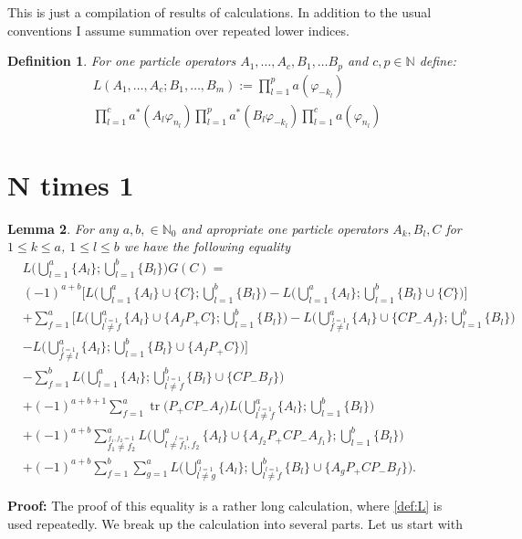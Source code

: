 \documentclass[b5paper,draft,openbib,12pt]{memoir}
\newtheorem{Def}{Definition}[section]
\newtheorem{Lemma}[Def]{Lemma}
\DeclareMathOperator{\tr}{tr}
\begin{document}
\frontmatter
%
\mainmatter

This is just a compilation of results of calculations. In addition to the usual conventions I assume summation over
repeated lower indices. 

\begin{Def}
For one particle operators \(A_1,\dots, A_c,B_1,\dots B_p \) and \(c,p\in\mathbb{N}\) define:
\begin{multline}\label{def:L}
L(A_1,\dots, A_c; B_1,\dots ,B_m):= \prod_{l=1}^p a(\varphi_{-k_l}) \\
\prod_{l=1}^c a^*(A_l \varphi_{n_l}) \prod_{l=1}^p a^*(B_l \varphi_{-k_l}) \prod_{l=1}^c a(\varphi_{n_l})
\end{multline}
\end{Def}


\section{N times 1}

\begin{Lemma} For any \(a,b,\in\mathbb{N}_0\) and apropriate one particle operators \(A_k, B_l, C\) for \(1\le k\le a\), \(1\le l\le b\) we have the following equality
\begin{align*}
&L\Big(\bigcup_{l=1}^a \{A_l\}; \bigcup_{l=1}^b \{B_l\}\Big)G(C) =\\
 &(-1)^{a+b}\Big[ L\Big(\bigcup_{l=1}^a \{A_l\}\cup \{C\}; \bigcup_{l=1}^b \{B_l\}\Big) - L\Big(\bigcup_{l=1}^a \{A_l\}; \bigcup_{l=1}^b \{B_l\}\cup \{C\} \Big) \Big]\\
&+ \sum_{f=1}^a \Big[ L\Big(\bigcup_{\stackrel{l=1}{l\neq f}}^a \{A_l\}\cup \{A_fP_+C \}; \bigcup_{l=1}^b \{B_l\}\Big) - 
 L\Big(\bigcup_{\stackrel{l=1}{f\neq l}}^a \{A_l\}\cup \{CP_- A_f\}; \bigcup_{l=1}^b \{B_l\}\Big)\\
& -L\Big(\bigcup_{\stackrel{l=1}{f\neq l}}^a \{A_l\}; \bigcup_{l=1}^b \{B_l\}\cup \{A_f P_+ C\}\Big) \Big]\\
&- \sum_{f=1}^b L\Big(\bigcup_{l=1}^a \{A_l\}; \bigcup_{\stackrel{l=1}{l\neq f}}^b \{B_l\}\cup \{CP_- B_f\}\Big)\\
&+ (-1)^{a+b+1} \sum_{f=1}^a \tr \Big(P_+ C P_- A_f\Big) L\Big(\bigcup_{\stackrel{l=1}{l \neq f}}^a \{A_l\}; \bigcup_{l=1}^b \{B_l\}\Big)\\
&+ (-1)^{a+b} \sum_{\stackrel{f_1,f_2=1}{f_1\neq f_2}}^a L\Big(\bigcup_{\stackrel{l=1}{l\neq f_1,f_2}}^a \{A_l\}\cup \{A_{f_2} P_+ C P_- A_{f_1}\}; \bigcup_{l=1}^b \{B_l\}\Big)\\
&+(-1)^{a+b} \sum_{f=1}^b \sum_{g=1}^a L\Big(\bigcup_{\stackrel{l=1}{l\neq g}}^a \{A_l\}; \bigcup_{\stackrel{l=1}{l\neq f}}^b \{B_l\}\cup \{A_g P_+ C P_- B_f\}\Big).
\end{align*}
\end{Lemma}
{\bfseries Proof:}  The proof of this equality is a rather long calculation, where \eqref{def:L} is used repeatedly. We break up the calculation into 
several parts. Let us start with
\end{document}
